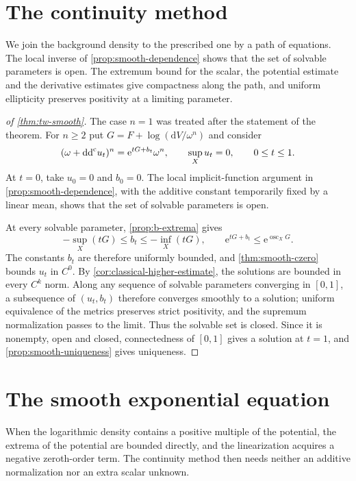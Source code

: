 

\section{The continuity method}
\label{sec:smooth-continuity-method}

We join the background density to the prescribed one by a path of equations. The local inverse of \cref{prop:smooth-dependence} shows that the set of solvable parameters is open. The extremum bound for the scalar, the potential estimate and the derivative estimates give compactness along the path, and uniform ellipticity preserves positivity at a limiting parameter.

\begin{proof}[of \cref{thm:tw-smooth}]
The case $n=1$ was treated after the statement of the theorem. For $n\geq2$ put
$G=F+\log(\mathrm{d}V/\omega^n)$ and consider
\[
 (\omega+\mathrm{dd}^{\mathrm{c}} u_t)^n=\mathrm{e}^{tG+b_t}\omega^n,
 \qquad\sup_Xu_t=0,\qquad0\leq t\leq1.
\]
At $t=0$, take $u_0=0$ and $b_0=0$. The local implicit-function argument in \cref{prop:smooth-dependence}, with the additive constant temporarily fixed by a linear mean, shows that the set of solvable parameters is open.

At every solvable parameter, \cref{prop:b-extrema} gives
\[
 -\sup_X(tG)\leq b_t\leq-\inf_X(tG),
 \qquad \mathrm{e}^{tG+b_t}\leq \mathrm{e}^{\operatorname{osc}_XG}.
\]
The constants $b_t$ are therefore uniformly bounded, and \cref{thm:smooth-czero} bounds $u_t$ in $C^0$. By \cref{cor:classical-higher-estimate}, the solutions are bounded in every $C^k$ norm. Along any sequence of solvable parameters converging in $[0,1]$, a subsequence of $(u_t,b_t)$ therefore converges smoothly to a solution; uniform equivalence of the metrics preserves strict positivity, and the supremum normalization passes to the limit. Thus the solvable set is closed. Since it is nonempty, open and closed, connectedness of $[0,1]$ gives a solution at $t=1$, and \cref{prop:smooth-uniqueness} gives uniqueness.
\end{proof}

\section{The smooth exponential equation}

When the logarithmic density contains a positive multiple of the potential, the extrema of the potential are bounded directly, and the linearization acquires a negative zeroth-order term. The continuity method then needs neither an additive normalization nor an extra scalar unknown.


